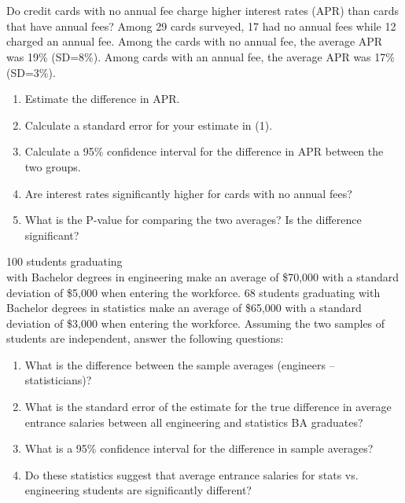 \documentclass[11pt, chapterprefix=true]{scrbook}\usepackage[]{graphicx}\usepackage[]{color}
\begin{document}
\twocolumn

\section{}

\begin{exercises}
\begin{exercise} %

Do credit cards with no annual fee charge higher interest rates (APR) than cards that have annual fees?  Among 29 cards surveyed, 17 had no annual fees while 12 charged an annual fee.  Among the cards with no annual fee, the average APR was 19\% (SD=8\%).  Among cards with an annual fee, the average APR was 17\% (SD=3\%).

\begin{enumerate}
  \item Estimate the difference in APR.
  \item Calculate a standard error for your estimate in (1).
  \item Calculate a 95\% confidence interval for the difference in APR between the two groups.
  \item Are interest rates significantly higher for cards with no annual fees?
  \item What is the P-value for comparing the two averages? Is the difference significant?
\end{enumerate}
\end{exercise}
\begin{solution} %


\end{solution}

\begin{exercise}  %

100 students graduating \\ with Bachelor degrees in engineering make an average of \$70,000 with a standard deviation of \$5,000 when entering the workforce. 68 students graduating with Bachelor degrees in statistics make an average of \$65,000 with a standard deviation of \$3,000 when entering the workforce. Assuming the two samples of students are independent, answer the following questions:

\begin{enumerate}
  \item What is the difference between the sample averages (engineers – statisticians)?
  \item What is the standard error of the estimate for the true difference in average entrance salaries between all engineering and statistics BA graduates?
  \item What is a 95\% confidence interval for the difference in sample averages?
  \item Do these statistics suggest that average entrance salaries for stats vs. engineering students are significantly different?
\end{enumerate}


\end{exercise}
\end{exercises}
\end{document}
